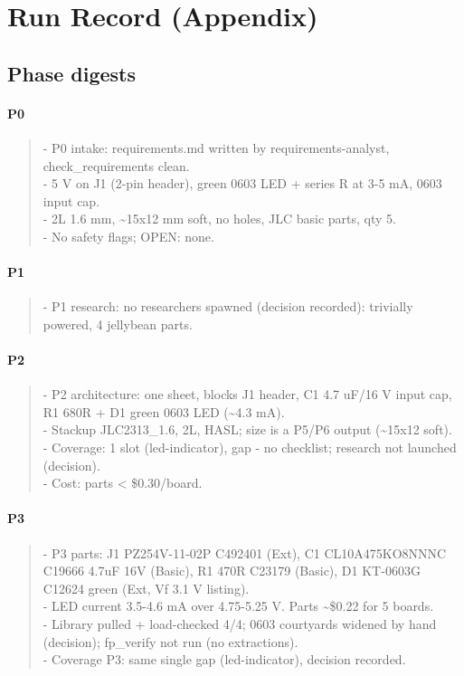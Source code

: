 \documentclass[11pt]{article}
\begin{document}
\section{Run Record (Appendix)}
\subsection*{Phase digests}
\paragraph*{P0}
\begin{quote}\small\ttfamily\raggedright
- P0 intake: requirements.md written by requirements-analyst, check\_requirements clean.\\
- 5 V on J1 (2-pin header), green 0603 LED + series R at 3-5 mA, 0603 input cap.\\
- 2L 1.6 mm, \textasciitilde{}15x12 mm soft, no holes, JLC basic parts, qty 5.\\
- No safety flags; OPEN: none.
\end{quote}
\paragraph*{P1}
\begin{quote}\small\ttfamily\raggedright
- P1 research: no researchers spawned (decision recorded): trivially powered, 4 jellybean parts.
\end{quote}
\paragraph*{P2}
\begin{quote}\small\ttfamily\raggedright
- P2 architecture: one sheet, blocks J1 header, C1 4.7 uF/16 V input cap, R1 680R + D1 green 0603 LED (\textasciitilde{}4.3 mA).\\
- Stackup JLC2313\_1.6, 2L, HASL; size is a P5/P6 output (\textasciitilde{}15x12 soft).\\
- Coverage: 1 slot (led-indicator), gap - no checklist; research not launched (decision).\\
- Cost: parts \textless{} \$0.30/board.
\end{quote}
\paragraph*{P3}
\begin{quote}\small\ttfamily\raggedright
- P3 parts: J1 PZ254V-11-02P C492401 (Ext), C1 CL10A475KO8NNNC C19666 4.7uF 16V (Basic), R1 470R C23179 (Basic), D1 KT-0603G C12624 green (Ext, Vf 3.1 V listing).\\
- LED current 3.5-4.6 mA over 4.75-5.25 V. Parts \textasciitilde{}\$0.22 for 5 boards.\\
- Library pulled + load-checked 4/4; 0603 courtyards widened by hand (decision); fp\_verify not run (no extractions).\\
- Coverage P3: same single gap (led-indicator), decision recorded.
\end{quote}
\end{document}
